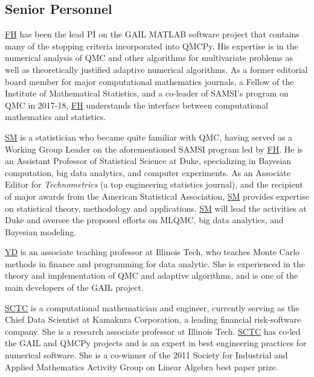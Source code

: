 \documentclass[11pt]{NSFamsart}
\newcommand{\FH}{\hyperlink{FHlink}{FH}\xspace}
\newcommand{\SM}{\hyperlink{SMlink}{SM}\xspace}
\newcommand{\SCTC}{\hyperlink{SCTClink}{SCTC}\xspace}
\newcommand{\YD}{\hyperlink{YDlink}{YD}\xspace}
\newcommand{\MATLAB}{MATLAB\xspace}
\begin{document}
\subsection{Senior Personnel}
\FH has been the lead PI on the GAIL \cite{ChoEtal21a} \MATLAB software project that contains many of the stopping criteria incorporated into QMCPy.  His expertise is in the numerical analysis of QMC and other algorithms for multivariate problems as well as theoretically justified adaptive numerical algorithms.  As a former editorial board member for major computational mathematics journals, a Fellow of the Institute of Mathematical Statistics, and a co-leader of SAMSI's program on QMC in 2017-18, \FH understands the interface between computational mathematics and statistics.

\SM is a statistician who became quite familiar with QMC, having served as a Working Group Leader on the aforementioned SAMSI program led by \FH. He is an Assistant Professor of Statistical Science at Duke, specializing in Bayesian computation, big data analytics, and computer experiments. As an Associate Editor for \textit{Technometrics} (a top engineering statistics journal), and the recipient of major awards from the American Statistical Association, \SM provides expertise on statistical theory, methodology and applications. \SM will lead the activities at Duke and oversee the proposed efforts on MLQMC, big data analytics, and Bayesian modeling.


\YD is an associate teaching professor at Illinois Tech, who teaches Monte Carlo methods in finance and programming for data analytic. She is experienced in the theory and implementation of QMC and adaptive algorithms, and is one of the main developers of the GAIL project.


\SCTC is a computational mathematician and engineer, currently serving as the Chief Data Scientist at Kamakura Corporation, a leading financial risk-software company.  She is a research associate professor at Illinois Tech.  \SCTC has co-led the GAIL and QMCPy projects and is an expert in best engineering practices for numerical software.  She is a co-winner of the 2011 Society for Industrial and Applied Mathematics Activity Group on Linear Algebra best paper prize.
\end{document}
